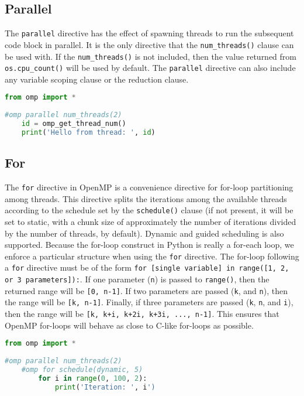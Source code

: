 \documentclass[letterpaper,12pt]{article} %
\begin{document}
\subsection{Parallel}
The \texttt{parallel} directive has the effect of spawning threads to run the subsequent code block in parallel. It is the only directive that the \texttt{num\_threads()} clause can be used with. If the \texttt{num\_threads()} is not included, then the value returned from \texttt{os.cpu\_count()} will be used by default. The \texttt{parallel} directive can also include any variable scoping clause or the reduction clause.

\begin{lstlisting}[language=Python]
from omp import *
 
#omp parallel num_threads(2)
	id = omp_get_thread_num()
	print('Hello from thread: ', id)
\end{lstlisting}



\subsection{For}
The \texttt{for} directive in OpenMP is a convenience directive for for-loop partitioning among threads. This directive splits the iterations among the available threads according to the schedule set by the \texttt{schedule()} clause (if not present, it will be set to static, with a chunk size of approximately the number of iterations divided by the number of threads, by default). Dynamic and guided scheduling is also supported. Because the for-loop construct in Python is really a for-each loop, we enforce a particular structure when using the \texttt{for} directive. The for-loop following a \texttt{for} directive must be of the form \texttt{for [single variable] in range([1, 2, or 3 parameters]):}. If one parameter (\texttt{n}) is passed to \texttt{range()}, then the returned range will be \texttt{[0, n-1]}. If two parameters are passed (\texttt{k}, and \texttt{n}), then the range will be \texttt{[k, n-1]}. Finally, if three parameters are passed (\texttt{k}, \texttt{n}, and \texttt{i}), then the range will be \texttt{[k, k+i, k+2i, k+3i, ..., n-1]}. This ensures that OpenMP for-loops will behave as close to C-like for-loops as possible.

\begin{lstlisting}[language=Python]
from omp import *
 
#omp parallel num_threads(2)
    #omp for schedule(dynamic, 5)
        for i in range(0, 100, 2):
            print('Iteration: ', i')
\end{lstlisting}
\end{document}
